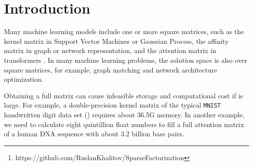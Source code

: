 \documentclass{article}
\begin{document}
\begin{abstract}
Square matrices appear in many machine learning problems and models. Optimization over a large square matrix is expensive in memory and in time. Therefore an economic approximation is needed. Conventional approximation approaches factorize the square matrix into a number matrices of much lower ranks. However, the low-rank constraint is a performance bottleneck if the approximated matrix is intrinsically high-rank or close to full rank. In this paper, we propose to approximate a large square matrix with a product of sparse full-rank matrices. In the approximation, our method needs only  non-zero numbers for an  full matrix. We present both non-parametric and parametric ways to find the factorization. In the former, we learn the factorizing matrices directly, and in the latter, we train neural networks to map input data to the non-zero matrix entries. The sparse factorization method is tested for a variety of synthetic and real-world square matrices. The experimental results demonstrate that our method gives a better approximation when the approximated matrix is sparse and high-rank. Based on this finding, we use our parametric method as a scalable attention architecture that performs strongly in learning tasks for long sequential data and defeats Transformer and its several variants. Our code is publicly available\footnote{https://github.com/RuslanKhalitov/SparseFactorization}.
\end{abstract}
	
	
	
	
\section{Introduction}
Many machine learning models include one or more square matrices, such as the kernel matrix in Support Vector Machines \citep{svm} or Gaussian Process, the affinity matrix in graph or network representation, and the attention matrix in transformers \citep{transformer}. In many machine learning problems, the solution space is also over square matrices, for example, graph matching and network architecture optimization.

Obtaining a full  matrix can cause infeasible storage and computational cost if  is large. For example, a double-precision kernel matrix of the typical \texttt{MNIST} handwritten digit data set () requires about 36.5G memory. In another example, we need to calculate eight quintillion float numbers to fill a full attention matrix of a human DNA sequence with about 3.2 billion base pairs.
\end{document}
